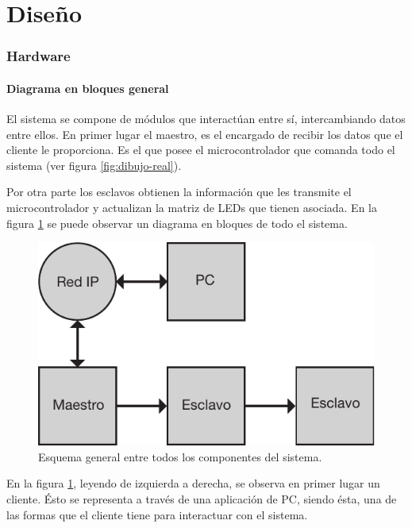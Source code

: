 \part{Diseño}\label{part:diseno}

\section{Hardware}\label{sec:hw}
\subsection{Diagrama en bloques general}
El sistema se compone de módulos que interactúan entre sí, intercambiando datos entre ellos. En primer lugar el maestro, es el encargado de recibir los datos que el cliente le proporciona. Es el que posee el microcontrolador que comanda todo el sistema (ver figura \ref{fig:dibujo-real}).

Por otra parte los esclavos obtienen la información que les transmite el microcontrolador y actualizan la matriz de LEDs que tienen asociada. En la figura \ref{fig:diagrama-bloques-general} se puede observar un diagrama en bloques de todo el sistema.

\begin{figure}[!ht]
	\centering
	\includegraphics[scale=1]{imagenes/esquema-general.pdf}
	\caption{Esquema general entre todos los componentes del sistema.}
	\label{fig:diagrama-bloques-general}
\end{figure}

En la figura \ref{fig:diagrama-bloques-general}, leyendo de izquierda a derecha, se observa en primer lugar un cliente. Ésto se representa a través de una aplicación de PC, siendo ésta, una de las formas que el cliente tiene para interactuar con el sistema.

